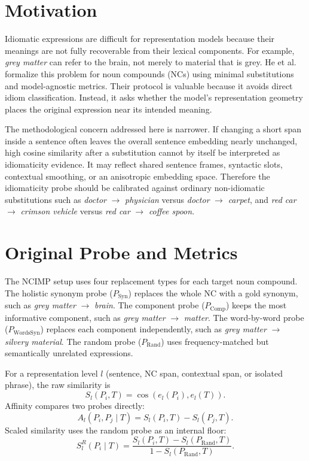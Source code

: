 \documentclass[11pt]{article}
\begin{document}
\section{Motivation}

Idiomatic expressions are difficult for representation models because their meanings are not fully
recoverable from their lexical components. For example, \emph{grey matter} can refer to the brain,
not merely to material that is grey. He et al.~\cite{he2025idiomaticity} formalize this problem for
noun compounds (NCs) using minimal substitutions and model-agnostic metrics. Their protocol is
valuable because it avoids direct idiom classification. Instead, it asks whether the model's
representation geometry places the original expression near its intended meaning.

The methodological concern addressed here is narrower. If changing a short span inside a sentence
often leaves the overall sentence embedding nearly unchanged, high cosine similarity after a
substitution cannot by itself be interpreted as idiomaticity evidence. It may reflect shared
sentence frames, syntactic slots, contextual smoothing, or an anisotropic embedding space. Therefore
the idiomaticity probe should be calibrated against ordinary non-idiomatic substitutions such as
\emph{doctor} $\rightarrow$ \emph{physician} versus \emph{doctor} $\rightarrow$ \emph{carpet}, and
\emph{red car} $\rightarrow$ \emph{crimson vehicle} versus \emph{red car} $\rightarrow$
\emph{coffee spoon}.

\section{Original Probe and Metrics}

The NCIMP setup uses four replacement types for each target noun compound. The holistic synonym
probe ($P_{\mathrm{Syn}}$) replaces the whole NC with a gold synonym, such as
\emph{grey matter} $\rightarrow$ \emph{brain}. The component probe ($P_{\mathrm{Comp}}$) keeps the
most informative component, such as \emph{grey matter} $\rightarrow$ \emph{matter}. The word-by-word
probe ($P_{\mathrm{WordsSyn}}$) replaces each component independently, such as
\emph{grey matter} $\rightarrow$ \emph{silvery material}. The random probe ($P_{\mathrm{Rand}}$)
uses frequency-matched but semantically unrelated expressions.

For a representation level $l$ (sentence, NC span, contextual span, or isolated phrase), the raw
similarity is
\begin{equation}
S_l(P_i, T) = \cos(e_l(P_i), e_l(T)).
\end{equation}
Affinity compares two probes directly:
\begin{equation}
A_l(P_i, P_j \mid T) = S_l(P_i,T)-S_l(P_j,T).
\end{equation}
Scaled similarity uses the random probe as an internal floor:
\begin{equation}
S^R_l(P_i \mid T) =
\frac{S_l(P_i,T)-S_l(P_{\mathrm{Rand}},T)}
{1-S_l(P_{\mathrm{Rand}},T)}.
\end{equation}
\end{document}

